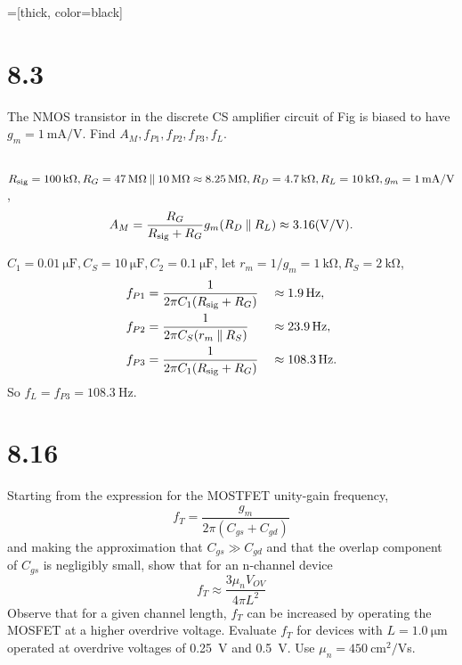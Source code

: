 \documentclass[12pt, a4paper]{article}
\title{} %
\author{} %
\date{} %
\begin{document}
=[thick, color=black]

\section{8.3}

The NMOS transistor in the discrete CS amplifier circuit of Fig
is biased to have $g_m = \SI{1}{\mA/\V}$. Find
$A_M, f_{P1}, f_{P2}, f_{P3}, f_L$.

\Ans \\

$R_{\text{sig}} = \SI{100}{\kohm},
R_G = \SI{47}{\Mohm} \paral \SI{10}{\Mohm}
\approx \SI{8.25}{\Mohm}, R_D = \SI{4.7}{\kohm}, R_L = \SI{10}{\kohm},
g_m = \SI{1}{\mA/\V}$,
\[ A_M = \frac{R_G}{R_{\text{sig}} + R_G}g_m(R_D \paral R_L)
\approx 3.16 (\si{\V/\V}). \]

$C_1 = \SI{0.01}{\micro\F}, C_S = \SI{10}{\micro\F}, C_2 = \SI{0.1}{\micro\F}$,
let $r_m = 1/g_m = \SI{1}{\kohm}, R_S = \SI{2}{\kohm}$,
\begin{alignat*}{3}
  f_{P1} &= \frac{1}{2\pi C_1(R_{\text{sig}}+R_G)} &&\approx \SI{1.9}{\Hz}, \\
  f_{P2} &= \frac{1}{2\pi C_S(r_m \paral R_S)} &&\approx \SI{23.9}{\Hz}, \\
  f_{P3} &= \frac{1}{2\pi C_1(R_{\text{sig}}+R_G)} &&\approx \SI{108.3}{\Hz}.
\end{alignat*}
So $f_L = f_{P3} = \SI{108.3}{\Hz}$.

\section{8.16}
Starting from the expression for the MOSTFET unity-gain frequency,
\[ f_T = \frac{g_m}{2\pi (C_{gs}+C_{gd})} \]
and making the approximation that $C_{gs} \gg C_{gd}$ and that the
overlap component of $C_{gs}$ is negligibly small, show that for an
n-channel device
\[ f_T \approx \frac{3\mu_nV_{OV}}{4\pi L^2} \]
Observe that for a given channel length, $f_T$ can be increased by
operating the MOSFET at a higher overdrive voltage. Evaluate $f_T$ for
devices with $L = \SI{1.0}{\um}$ operated at overdrive voltages of
\SI{0.25}{\V} and \SI{0.5}{\V}. Use $\mu_n = \SI{450}{\cm^2/\V}$s.
\end{document}
